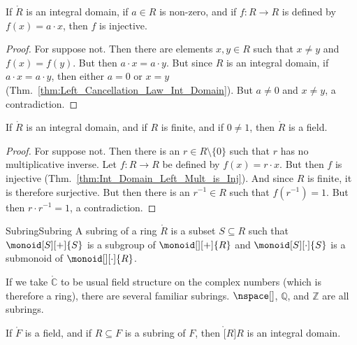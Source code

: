 \documentclass{article}                                                        %
\begin{document}
        \begin{theorem}
            \label{thm:Int_Domain_Left_Mult_is_Inj}%
            If $\ring{R}$ is an integral domain, if $a\in{R}$ is non-zero, and
            if $f:R\rightarrow{R}$ is defined by $f(x)=a\cdot{x}$, then $f$
            is injective.
        \end{theorem}
        \begin{proof}
            For suppose not. Then there are elements $x,y\in{R}$ such that
            $x\ne{y}$ and $f(x)=f(y)$. But then $a\cdot{x}=a\cdot{y}$. But since
            $R$ is an integral domain, if $a\cdot{x}=a\cdot{y}$, then either
            $a=0$ or $x=y$ (Thm.~\ref{thm:Left_Cancellation_Law_Int_Domain}).
            But $a\ne{0}$ and $x\ne{y}$, a contradiction.
        \end{proof}
        \begin{theorem}
            \label{thm:Finite_Int_Domain_if_Field}%
            If $\ring{R}$ is an integral domain, and if $R$ is finite, and if
            $0\ne{1}$, then $\ring{R}$ is a field.
        \end{theorem}
        \begin{proof}
            For suppose not. Then there is an $r\in{R}\setminus\{0\}$ such that
            $r$ has no multiplicative inverse. Let $f:R\rightarrow{R}$ be
            defined by $f(x)=r\cdot{x}$. But then $f$ is injective
            (Thm.~\ref{thm:Int_Domain_Left_Mult_is_Inj}). And since $R$ is
            finite, it is therefore surjective. But then there is an
            $r^{\minus{1}}\in{R}$ such that $f(r^{\minus{1}})=1$. But then
            $r\cdot{r}^{\minus{1}}=1$, a contradiction.
        \end{proof}
        \begin{fdefinition}{Subring}{Subring}
            A subring of a ring $\ring{R}$ is a subset $S\subseteq{R}$ such that
            $\monoid[S][+]{S}$ is a subgroup of $\monoid[][+]{R}$ and
            $\monoid[S][\cdot]{S}$ is a submonoid of $\monoid[][\cdot]{R}$.
        \end{fdefinition}
        \begin{example}
            If we take $\ring{\mathbb{C}}$ to be usual field structure on the
            complex numbers (which is therefore a ring), there are several
            familiar subrings. $\nspace[]$, $\mathbb{Q}$, and $\mathbb{Z}$ are
            all subrings.
        \end{example}
        \begin{theorem}
            \label{thm:Subring_of_Field_is_Int_Domain}%
            If $\ring{F}$ is a field, and if $R\subseteq{F}$ is a subring of
            $F$, then $\ring[R]{R}$ is an integral domain.
        \end{theorem}
\end{document}
